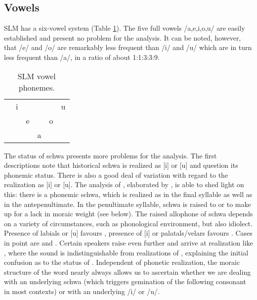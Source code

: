 \subsection{Vowels}
SLM has a six-vowel system (Table \ref{tab:SLMVowelPhonemes}).
The five full vowels /a,e,i,o,u/ are easily established and present no problem for the analysis. It can be noted, however, that /e/ and /o/ are remarkably less frequent than /i/ and /u/ which are in turn less frequent than /a/, in a ratio of about 1:1:3:3:9.

    \begin{table}[!h]
    \centering
        \begin{tabular}{rccccc}
                &  i    &  	 &        	 &  		 &   u   \\
                &       &  e &  \textipa{@}       &  o &      \\
                &       &   &    a   &   &      \\
        \end{tabular}
    \caption{SLM vowel phonemes.}
    \label{tab:SLMVowelPhonemes}
  \end{table}

The status of schwa presents more problems for the analysis. The first descriptions \citep{Hussainmiya1987,Bichsel1989} note that historical schwa is realized as [i] or [u] and question its phonemic status. There is also a good deal of variation with regard to the realization as [i] or [u]. The analysis of \citet{Tapovanaye1986,Tapovanaye1995}, elaborated by \citet{Nordhoff2009}, is able to shed light on this: there is a phonemic schwa, which is realized as  in the final syllable as well as in the antepenultimate. In the penultimate syllable, schwa is raised to  or   to make up for a lack in moraic weight (see below). The raised allophone of schwa depends on a variety of circumstances, such as phonological environment, but also idiolect. Presence of labials or [u] favours , presence of [i] or palatals/velars favours . Cases in point are  and . Certain speakers raise  even further and arrive at realization like , where  the sound is indistinguishable from realizations of , explaining the initial confusion as to the status of . Independent of phonetic realization, the moraic structure of the word nearly always allows us to ascertain whether we are dealing with an underlying schwa (which triggers gemination of the following consonant in most contexts) or with an underlying /i/ or /u/. 


